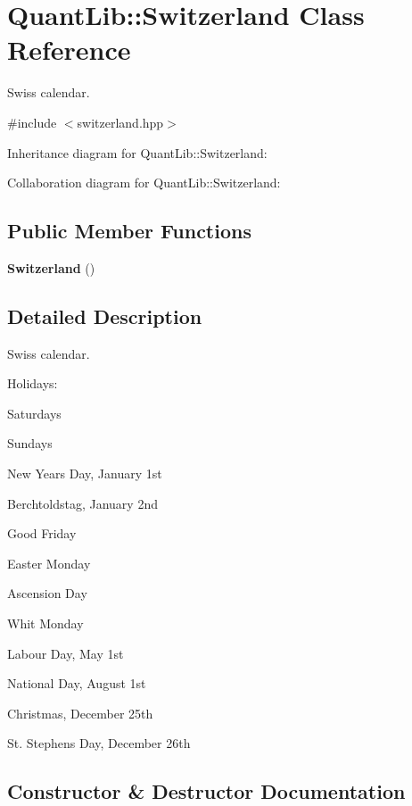 \section{Quant\+Lib\+:\+:Switzerland Class Reference}
\label{class_quant_lib_1_1_switzerland}


Swiss calendar.  




{\ttfamily \#include $<$switzerland.\+hpp$>$}



Inheritance diagram for Quant\+Lib\+:\+:Switzerland\+:


Collaboration diagram for Quant\+Lib\+:\+:Switzerland\+:
\subsection*{Public Member Functions}
\begin{DoxyCompactItemize}
\item 
{\bf Switzerland} ()
\end{DoxyCompactItemize}


\subsection{Detailed Description}
Swiss calendar. 

Holidays\+: 
\begin{DoxyItemize}
\item Saturdays 
\item Sundays 
\item New Year\textquotesingle{}s Day, January 1st 
\item Berchtoldstag, January 2nd 
\item Good Friday 
\item Easter Monday 
\item Ascension Day 
\item Whit Monday 
\item Labour Day, May 1st 
\item National Day, August 1st 
\item Christmas, December 25th 
\item St. Stephen\textquotesingle{}s Day, December 26th 
\end{DoxyItemize}

\subsection{Constructor \& Destructor Documentation}
